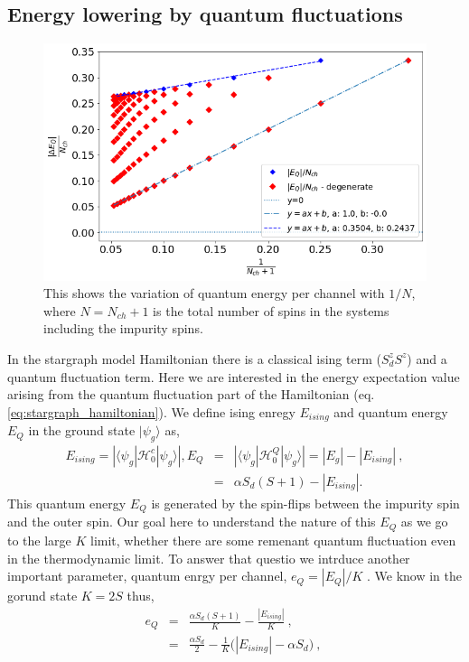 \documentclass[reprint,prb,superscriptaddress]{revtex4-2}
\begin{document}
\subsection{Energy lowering by quantum fluctuations}
\begin{figure}[!h]
\centering
\includegraphics[scale=0.34]{plt/Quantum_Energy_per_channel}
\caption{This shows the variation of quantum energy per channel with $1/N$, where $N=N_{ch}+1$ is the total number of spins in the systems including the impurity spins. }
\label{fig:quantum_energy}
\end{figure}
\noindent In the stargraph model Hamiltonian there is a classical ising term ($S_d^zS^z$) and a quantum fluctuation term. Here we are interested in the energy expectation value arising from the quantum fluctuation part of the Hamiltonian (eq.\ref{eq:stargraph_hamiltonian}). We define ising enregy $E_{ising}$ and quantum energy $E_{Q}$ in the ground state $|\psi_g\rangle$ as,
\begin{eqnarray}
E_{ising} = |\langle \psi_g | \mathcal{H}^c_0 | \psi_g \rangle|, E_{Q} &=& |\langle \psi_g | \mathcal{H}^Q_0 | \psi_g \rangle|=|E_g|-|E_{ising}|~, \nonumber\\
&=& {\alpha S_d(S+1)}- |E_{ising}|.
\end{eqnarray}  
This quantum energy $E_Q$ is generated by the spin-flips between the impurity spin and the outer spin. Our goal here to understand the nature of this $E_Q$ as we go to the large $K$ limit, whether there are some remenant quantum fluctuation even in the thermodynamic limit. To answer that questio we intrduce another important parameter, quantum enrgy per channel, $e_Q=|E_Q|/K$ . We know in the gorund state $K=2S$ thus,
\begin{eqnarray}
e_Q &=& \frac{\alpha S_d(S+1)}{K} - \frac{|E_{ising}|}{K} ~,~\nonumber\\
&=& \frac{\alpha S_d}{2} -\frac{1}{K} \bigg(|E_{ising}| -\alpha S_d  \bigg)~,~
\end{eqnarray}
\end{document}
